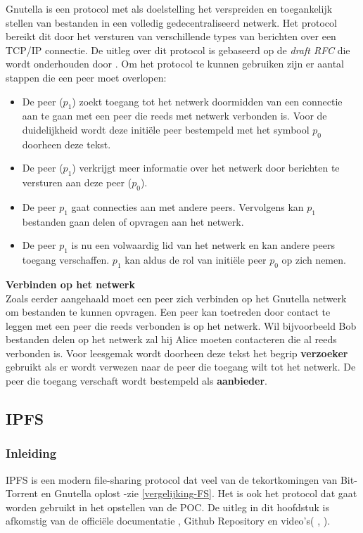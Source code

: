 Gnutella is een protocol met als doelstelling het verspreiden en toegankelijk stellen van bestanden in een volledig gedecentraliseerd netwerk. Het protocol bereikt dit door het versturen van verschillende types van berichten over een TCP/IP connectie. De uitleg over dit protocol is gebaseerd op de \textit{draft RFC} die wordt onderhouden door \textcite{Klingberg2002}. Om het protocol te kunnen gebruiken zijn er aantal stappen die een peer moet overlopen:

\begin{itemize}
\item De peer ($p_1$) zoekt toegang tot het netwerk doormidden van een connectie aan te gaan met een peer die reeds met netwerk verbonden is. Voor de duidelijkheid wordt deze initiële peer bestempeld met het symbool $p_0$ doorheen deze tekst.\\
\item De peer ($p_1$) verkrijgt meer informatie over het netwerk door berichten te versturen aan deze peer ($p_0$).\\
\item De peer $p_1$ gaat connecties aan met andere peers. Vervolgens kan $p_1$ bestanden gaan delen of opvragen aan het netwerk.\\
\item De peer $p_1$ is nu een volwaardig lid van het netwerk en kan andere peers toegang verschaffen. $p_1$ kan aldus de rol van initiële peer $p_0$ op zich nemen.
\end{itemize}


\textbf{Verbinden op het netwerk}\\

Zoals eerder aangehaald moet een peer zich verbinden op het Gnutella netwerk om bestanden te kunnen opvragen. Een peer kan toetreden door contact te leggen met een peer die reeds verbonden is op het netwerk. Wil bijvoorbeeld Bob bestanden delen op het netwerk zal hij Alice moeten contacteren die al reeds verbonden is. Voor leesgemak wordt doorheen deze tekst het begrip \textbf{verzoeker} gebruikt als er wordt verwezen naar de peer die toegang wilt tot het netwerk. De peer die toegang verschaft wordt bestempeld als \textbf{aanbieder}.\\


\subsection{IPFS}
\label{IPFS}
\subsubsection{Inleiding}
IPFS is een modern file-sharing protocol dat veel van de tekortkomingen van Bit-Torrent en Gnutella oplost -zie \ref{vergelijking-FS}. Het is ook het protocol dat gaat worden gebruikt in het opstellen van de POC. De uitleg in dit hoofdstuk is afkomstig van de officiële documentatie \autocite{}, Github Repository \autocite{} en video's(\autocite{} , \autocite{}).\\

